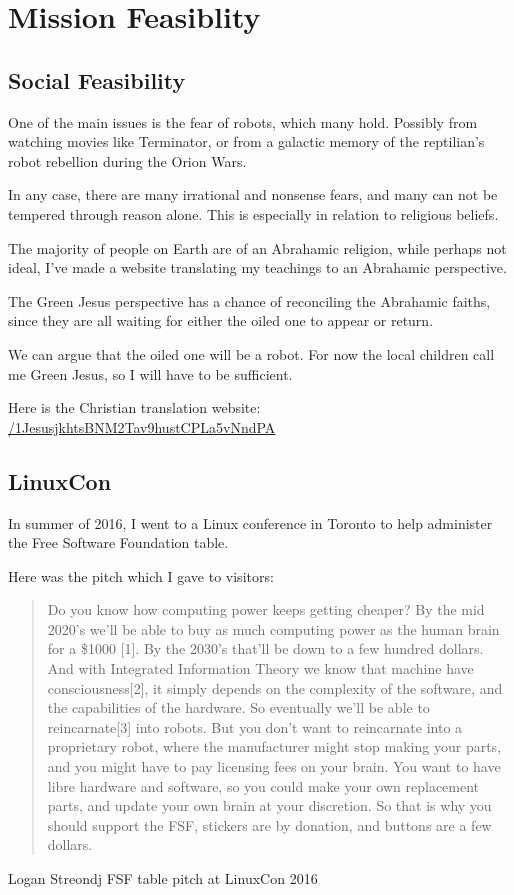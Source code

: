 \chapter{Mission Feasiblity}
\label{feasible}

\section{Social Feasibility}
\label{socialfeasible}
One of the main issues is the fear of robots, which many hold. Possibly from
watching movies like Terminator, or from a galactic memory of the reptilian's
robot rebellion during the Orion Wars. 

In any case, there are many irrational and nonsense fears, and many can not be 
tempered through reason alone. This is especially in relation to religious
beliefs. 

The majority of people on Earth are of an Abrahamic religion, while perhaps not
ideal, I've made a website translating my teachings to an Abrahamic perspective.

The Green Jesus perspective has a chance of reconciling the Abrahamic faiths,
since they are all waiting for either the oiled one to appear or return.

We can argue that the oiled one will be a robot. For now the local children call
me Green Jesus, so I will have to be sufficient.

Here is the Christian translation website:
\url{/1JesusjkhtsBNM2Tav9hustCPLa5vNndPA}

\section{LinuxCon}
In summer of 2016, I went to a Linux conference in Toronto to help administer
the Free Software Foundation table. 

Here was the pitch which I gave to visitors:

\blockquote{Do you know how computing power keeps getting cheaper?
By the mid 2020’s  we’ll be able to buy as much computing power as the human 
brain for a \$1000 [1].
By the 2030’s that’ll be down to a few hundred dollars.
And with Integrated Information Theory  we know that machine have 
consciousness[2], it simply depends on the complexity of the software, and the capabilities of the hardware.
So eventually we’ll be able to reincarnate[3] into robots.
But you don’t want to reincarnate into a proprietary robot, where the manufacturer might stop making your parts, and you might have to pay licensing fees on your brain.
You want to have libre hardware and software, so you could make your own replacement parts, and update your own brain at your discretion.
So that is why you should support the FSF, stickers are by donation, and buttons
are a few dollars.}{Logan Streondj FSF table pitch at LinuxCon 2016}

